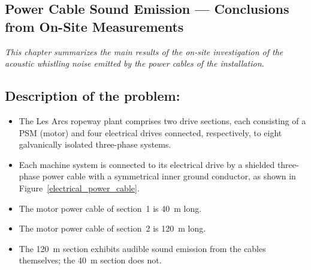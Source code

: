 \documentclass[11pt,a4paper,oneside]{book}
\begin{document}
\begin{onehalfspace}
\chapter{Power Cable Sound Emission --- Conclusions from On-Site Measurements}
\label{sec:onsite_summary}

\textit{This chapter summarizes the main results of the on-site investigation of the acoustic whistling noise emitted by the power cables of the installation.}

\section{Description of the problem:}
\begin{itemize}
	\item[--] The Les Arcs ropeway plant comprises two drive sections, each
	consisting of a PSM (motor) and four electrical drives connected,
	respectively, to eight galvanically isolated three-phase systems.
	\item[--] Each machine system is connected to its electrical drive by a
	shielded three-phase power cable with a symmetrical inner ground
	conductor, as shown in Figure~\ref{electrical_power_cable}.
	\item[--] The motor power cable of section~1 is \SI{40}{\meter} long.
	\item[--] The motor power cable of section~2 is \SI{120}{\meter} long.
	\item[--] The \SI{120}{\meter} section exhibits audible sound emission from
	the cables themselves; the \SI{40}{\meter} section does not.
\end{itemize}


\end{onehalfspace}
\end{document}
